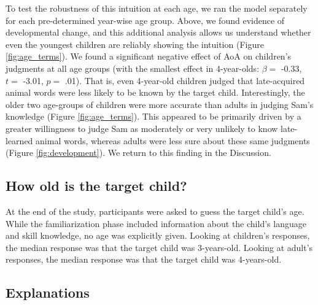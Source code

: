 \documentclass[10pt, letterpaper]{article}
\begin{document}
To test the robustness of this intuition at each age, we ran the model
separately for each pre-determined year-wise age group. Above, we found
evidence of developmental change, and this additional analysis allows us
understand whether even the youngest children are reliably showing the
intuition (Figure \ref{fig:age_terms}). We found a significant negative
effect of AoA on children's judgments at all age groups (with the
smallest effect in 4-year-olds: \(\beta =\) -0.33, \(t =\) -3.01,
\(p =\) .01). That is, even 4-year-old children judged that
late-acquired animal words were less likely to be known by the target
child. Interestingly, the older two age-groups of children were more
accurate than adults in judging Sam's knowledge (Figure
\ref{fig:age_terms}). This appeared to be primarily driven by a greater
willingness to judge Sam as moderately or very unlikely to know
late-learned animal words, whereas adults were less sure about these
same judgments (Figure \ref{fig:development}). We return to this finding
in the Discussion.

\hypertarget{how-old-is-the-target-child}{%
\subsection{How old is the target
child?}\label{how-old-is-the-target-child}}

At the end of the study, participants were asked to guess the target
child's age. While the familiarization phase included information about
the child's language and skill knowledge, no age was explicitly given.
Looking at children's responses, the median response was that the target
child was 3-years-old. Looking at adult's responses, the median response
was that the target child was 4-years-old.

\hypertarget{explanations}{%
\subsection{Explanations}\label{explanations}}
\end{document}
